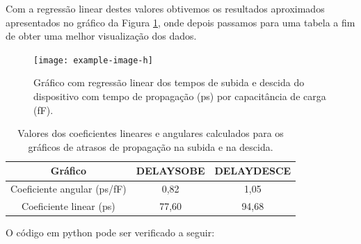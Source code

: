 ﻿\documentclass[12pt,a4paper]{article}
\begin{document}
Com a regressão linear destes valores obtivemos os resultados aproximados apresentados no gráfico da Figura \ref{fig:linear_regression}, onde depois passamos para uma tabela a fim de obter uma melhor visualização dos dados.

\begin{figure}[H]
    \centering
    \texttt{[image: example-image-h]}
    \caption{Gráfico com regressão linear dos tempos de subida e descida do dispositivo com tempo de propagação (ps) por capacitância de carga (fF).}
    \label{fig:linear_regression}
\end{figure}

\begin{table}[H]
    \centering
    \caption{Valores dos coeficientes lineares e angulares calculados para os gráficos de atrasos de propagação na subida e na descida.}
    \label{tab:coefficients}
    \begin{tabular}{ccc}
        \toprule
        Gráfico & DELAYSOBE & DELAYDESCE \\
        \midrule
        Coeficiente angular (ps/fF) & 0,82 & 1,05 \\
        Coeficiente linear (ps) & 77,60 & 94,68 \\
        \bottomrule
    \end{tabular}
\end{table}

O código em python pode ser verificado a seguir:
\end{document}
